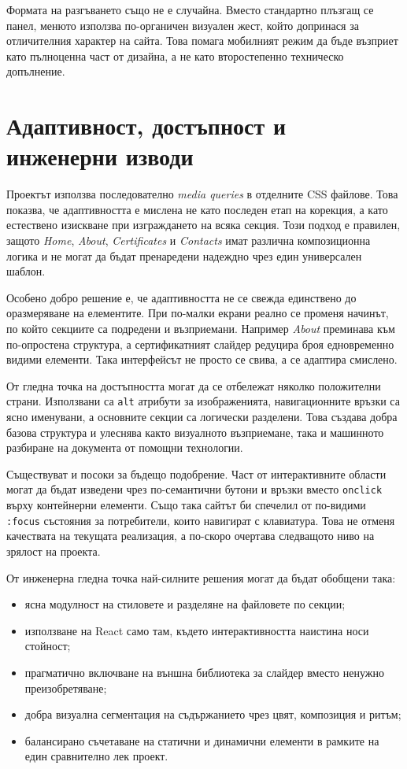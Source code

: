 \documentclass[11pt,a4paper]{article}
\begin{document}
Формата на разгъването също не е случайна. Вместо стандартно плъзгащ се панел, менюто използва по-органичен визуален жест, който допринася за отличителния характер на сайта. Това помага мобилният режим да бъде възприет като пълноценна част от дизайна, а не като второстепенно техническо допълнение.

\section{Адаптивност, достъпност и инженерни изводи}
Проектът използва последователно \textit{media queries} в отделните CSS файлове. Това показва, че адаптивността е мислена не като последен етап на корекция, а като естествено изискване при изграждането на всяка секция. Този подход е правилен, защото \textit{Home}, \textit{About}, \textit{Certificates} и \textit{Contacts} имат различна композиционна логика и не могат да бъдат пренаредени надеждно чрез един универсален шаблон.

Особено добро решение е, че адаптивността не се свежда единствено до оразмеряване на елементите. При по-малки екрани реално се променя начинът, по който секциите са подредени и възприемани. Например \textit{About} преминава към по-опростена структура, а сертификатният слайдер редуцира броя едновременно видими елементи. Така интерфейсът не просто се свива, а се адаптира смислено.

От гледна точка на достъпността могат да се отбележат няколко положителни страни. Използвани са \texttt{alt} атрибути за изображенията, навигационните връзки са ясно именувани, а основните секции са логически разделени. Това създава добра базова структура и улеснява както визуалното възприемане, така и машинното разбиране на документа от помощни технологии.

Съществуват и посоки за бъдещо подобрение. Част от интерактивните области могат да бъдат изведени чрез по-семантични бутони и връзки вместо \texttt{onclick} върху контейнерни елементи. Също така сайтът би спечелил от по-видими \texttt{:focus} състояния за потребители, които навигират с клавиатура. Това не отменя качествата на текущата реализация, а по-скоро очертава следващото ниво на зрялост на проекта.

От инженерна гледна точка най-силните решения могат да бъдат обобщени така:
\begin{itemize}
    \item ясна модулност на стиловете и разделяне на файловете по секции;
    \item използване на React само там, където интерактивността наистина носи стойност;
    \item прагматично включване на външна библиотека за слайдер вместо ненужно преизобретяване;
    \item добра визуална сегментация на съдържанието чрез цвят, композиция и ритъм;
    \item балансирано съчетаване на статични и динамични елементи в рамките на един сравнително лек проект.
\end{itemize}
\end{document}
